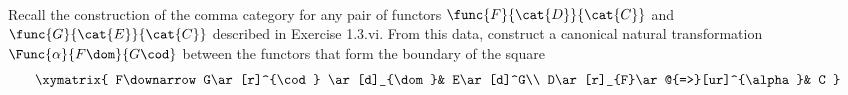 \documentclass[../../main]{subfiles}
\begin{document}
\paragraph{}
%

\begin{exercise}
	Recall the construction of the comma category for any pair of functors
	$\func{F}{\cat{D}}{\cat{C}}$ and $\func{G}{\cat{E}}{\cat{C}}$ described in
	Exercise 1.3.vi. From this data, construct a canonical natural
	transformation $\Func{\alpha}{F\dom}{G\cod}$ between the functors that form
	the boundary of the square
	\[\xymatrix{
			F\downarrow G\ar[r]^{\cod} \ar[d]_{\dom}& E\ar[d]^G\\
			D\ar[r]_{F}\ar@{=>}[ur]^{\alpha}& C
		}\]
\end{exercise}
\end{document}
